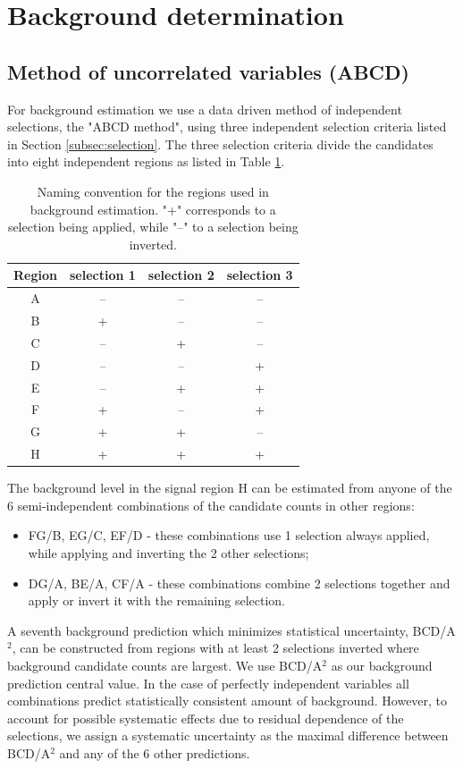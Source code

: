 \section{Background determination}
\label{sec:background}

\subsection{Method of uncorrelated variables (ABCD)}
\label{subsec:abcd}
For background estimation we use a data driven method of independent selections, the "ABCD method", using
 three independent selection criteria listed in Section \ref{subsec:selection}. 
The three selection criteria divide the candidates into eight
independent regions as listed in Table \ref{tab:regions}.

\begin{table}[htbp]
\centering
\caption{Naming convention for the regions used in background estimation. "+" corresponds to a selection 
being applied, while "--" to a selection being inverted. \label{tab:regions}}
\begin{tabular}{cccc}
 \hline
  Region & selection 1 & selection 2 & selection 3 \\
 \hline
 A & -- & -- & -- \\
 B & + & -- & -- \\
 C & -- & + & -- \\
 D & -- & -- & + \\
 E & -- & + & + \\
 F & + & -- & + \\
 G & + & + & -- \\
 H & + & + & + \\
\hline
\end{tabular} 
\end{table}

The background level in the signal region H can be estimated from anyone of the 6 semi-independent combinations
of the candidate counts in other regions:
\begin{itemize}
\item FG/B, EG/C, EF/D - these combinations use 1 selection always applied, while applying and inverting the 
2 other selections;
\item DG/A, BE/A, CF/A - these combinations combine 2 selections together and apply or invert it with the 
remaining selection.
\end{itemize}

A seventh background prediction which minimizes statistical uncertainty, BCD/A$^2$, can be constructed from regions
with at least 2 selections inverted where background candidate counts are largest. 
We use BCD/A$^2$ as our background prediction central value. In the case of perfectly independent 
variables all combinations predict statistically consistent  amount of background. 
However, to account for possible systematic
effects due to residual dependence of the selections, we assign a systematic uncertainty as the maximal difference 
between BCD/A$^2$ and any of the 6 other predictions.

